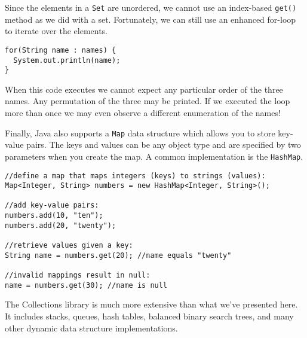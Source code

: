 Since the elements in a \texttt{Set} are unordered, 
we cannot use an index-based \texttt{get()} method
as we did with a set.  Fortunately, we can still use an enhanced
for-loop to iterate over the elements.

\begin{verbatim}
for(String name : names) {
  System.out.println(name);
}
\end{verbatim}

When this code executes we cannot expect any particular order of
the three names.  Any permutation of the three may be printed.  If
we executed the loop more than once we may even observe a different
enumeration of the names!

Finally, Java also supports a \texttt{Map} data structure
which allows you to store key-value pairs.  The keys and values
can be any object type and are specified by two parameters when
you create the map.  A common implementation is the \texttt{HashMap}.

\begin{verbatim}
//define a map that maps integers (keys) to strings (values):
Map<Integer, String> numbers = new HashMap<Integer, String>();

//add key-value pairs:
numbers.add(10, "ten");
numbers.add(20, "twenty");

//retrieve values given a key:
String name = numbers.get(20); //name equals "twenty"

//invalid mappings result in null:
name = numbers.get(30); //name is null
\end{verbatim}

The Collections library is much more extensive than what we've 
presented here.  It includes stacks, queues, hash tables, balanced 
binary search trees, and many other dynamic data structure 
implementations.
